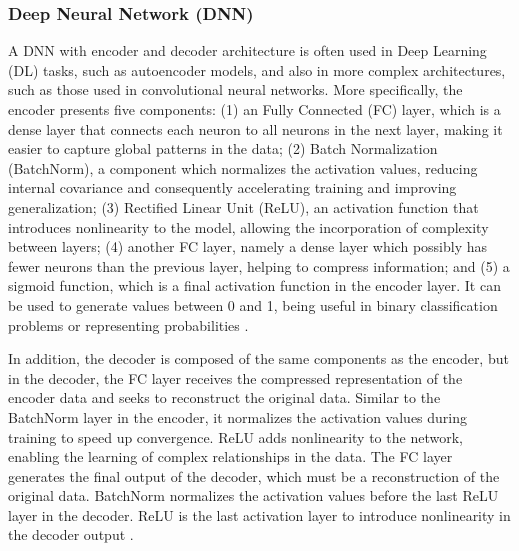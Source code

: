 \documentclass[conference]{IEEEtran}
\begin{document}
\subsubsection{Deep Neural Network (DNN)}
A DNN with encoder and decoder architecture is often used in Deep Learning (DL) tasks, such as autoencoder models, and also in more complex architectures, such as those used in convolutional neural networks. More specifically, the encoder presents five components: (1) an Fully Connected (FC) layer, which is a dense layer that connects each neuron to all neurons in the next layer, making it easier to capture global patterns in the data; (2) Batch Normalization (BatchNorm), a component which normalizes the activation values, reducing internal covariance and consequently accelerating training and improving generalization; (3) Rectified Linear Unit (ReLU), an activation function that introduces nonlinearity to the model, allowing the incorporation of complexity between layers; (4) another FC layer, namely a dense layer which possibly has fewer neurons than the previous layer, helping to compress information; and (5) a sigmoid function, which is a final activation function in the encoder layer. It can be used to generate values between 0 and 1, being useful in binary classification problems or representing probabilities \cite{b158}.

In addition, the decoder is composed of the same components as the encoder, but in the decoder, the FC layer receives the compressed representation of the encoder data and seeks to reconstruct the original data. Similar to the BatchNorm layer in the encoder, it normalizes the activation values during training to speed up convergence. ReLU adds nonlinearity to the network, enabling the learning of complex relationships in the data. The FC layer generates the final output of the decoder, which must be a reconstruction of the original data. BatchNorm normalizes the activation values before the last ReLU layer in the decoder. ReLU is the last activation layer to introduce nonlinearity in the decoder output \cite{b159}.
\end{document}
